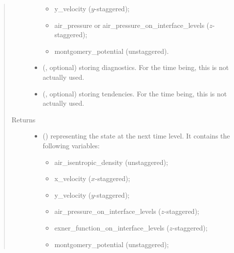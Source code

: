 \documentclass[letterpaper,10pt,english]{sphinxmanual}
\begin{document}
\begin{fulllineitems}
\begin{fulllineitems}
\begin{quote}
\begin{description}
\begin{itemize}
\begin{itemize}
\item {} 
y\_velocity (\(y\)-staggered);

\item {} 
air\_pressure or air\_pressure\_on\_interface\_levels (\(z\)-staggered);

\item {} 
montgomery\_potential (unstaggered).

\end{itemize}


\item {} 
 (, optional) \textendash{} {\hyperref[\detokenize{api:tasmania.storages.grid_data.GridData}]{}} storing diagnostics.
For the time being, this is not actually used.

\item {} 
 (, optional) \textendash{} {\hyperref[\detokenize{api:tasmania.storages.grid_data.GridData}]{}} storing tendencies.
For the time being, this is not actually used.

\end{itemize}

\item[{Returns}] \leavevmode
\begin{itemize}
\item {} 
 () \textendash{} {\hyperref[\detokenize{api:tasmania.storages.state_isentropic.StateIsentropic}]{}} representing the state at the next time level.
It contains the following variables:
\begin{itemize}
\item {} 
air\_isentropic\_density (unstaggered);

\item {} 
x\_velocity (\(x\)-staggered);

\item {} 
y\_velocity (\(y\)-staggered);

\item {} 
air\_pressure\_on\_interface\_levels (\(z\)-staggered);

\item {} 
exner\_function\_on\_interface\_levels (\(z\)-staggered);

\item {} 
montgomery\_potential (unstaggered);


\end{itemize}
\end{itemize}
\end{description}
\end{quote}
\end{fulllineitems}
\end{fulllineitems}
\end{document}
